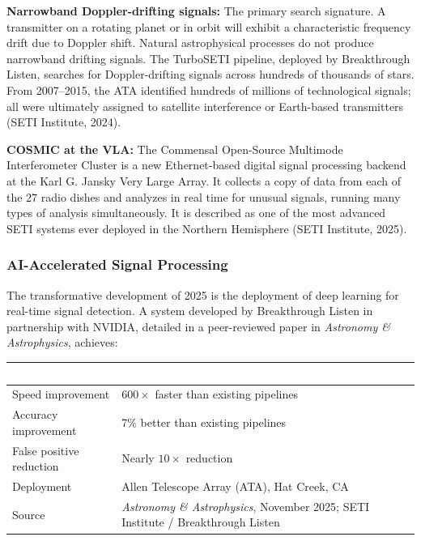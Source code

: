 \documentclass[11pt,letterpaper]{article}
\newcommand{\tableheader}[1]{\textbf{\sffamily\textcolor{white}{#1}}}
\begin{document}
\textbf{Narrowband Doppler-drifting signals:} The primary search signature. A transmitter on a rotating planet or in orbit will exhibit a characteristic frequency drift due to Doppler shift. Natural astrophysical processes do not produce narrowband drifting signals. The TurboSETI pipeline, deployed by Breakthrough Listen, searches for Doppler-drifting signals across hundreds of thousands of stars. From 2007--2015, the ATA identified hundreds of millions of technological signals; all were ultimately assigned to satellite interference or Earth-based transmitters (SETI Institute, 2024).

\textbf{COSMIC at the VLA:} The Commensal Open-Source Multimode Interferometer Cluster is a new Ethernet-based digital signal processing backend at the Karl G. Jansky Very Large Array. It collects a copy of data from each of the 27 radio dishes and analyzes in real time for unusual signals, running many types of analysis simultaneously. It is described as one of the most advanced SETI systems ever deployed in the Northern Hemisphere (SETI Institute, 2025).

\subsubsection{AI-Accelerated Signal Processing}

The transformative development of 2025 is the deployment of deep learning for real-time signal detection. A system developed by Breakthrough Listen in partnership with NVIDIA, detailed in a peer-reviewed paper in \textit{Astronomy \& Astrophysics}, achieves:

\begin{center}
\begin{tabularx}{\textwidth}{L{5cm}X}
\toprule
{}
\tableheader{Metric} & \tableheader{Result} \\
\midrule
Speed improvement & $600\times$ faster than existing pipelines \\
Accuracy improvement & 7\% better than existing pipelines \\
False positive reduction & Nearly $10\times$ reduction \\
Deployment & Allen Telescope Array (ATA), Hat Creek, CA \\
Source & \textit{Astronomy \& Astrophysics}, November 2025; SETI Institute / Breakthrough Listen \\
\bottomrule
\end{tabularx}
\end{center}
\end{document}
